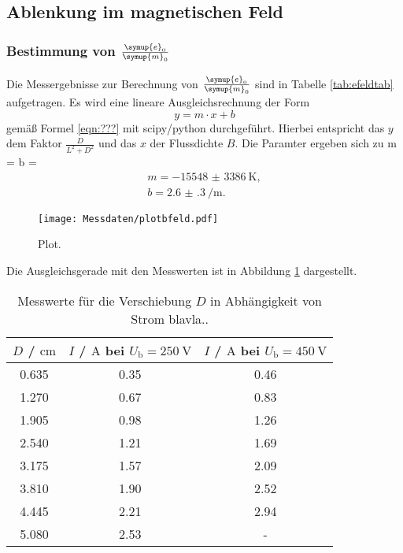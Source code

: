 \FloatBarrier
\subsection{Ablenkung im magnetischen Feld}

\subsubsection{Bestimmung von $\frac{\symup{e}_0}{\symup{m}_0}$}
Die Messergebnisse zur Berechnung von $\frac{\symup{e}_0}{\symup{m}_0}$ sind in Tabelle
\ref{tab:efeldtab} aufgetragen. Es wird eine lineare Ausgleichsrechnung der Form 
\begin{equation*}
	y = m \cdot x + b
\end{equation*}
gemäß Formel \eqref{eqn:???} mit scipy/python \cite{scipy} durchgeführt. Hierbei entspricht das
$y$ dem Faktor $\frac{D}{L^2+D^2}$ und das $x$ der Flussdichte $B$.
Die Paramter ergeben sich zu
m = b =  \begin{gather*}
	m = -\SI{15548(3386)}{\kelvin} \mathrm{,} \\
	b = \SI{2.6(3)}{\per\meter} \mathrm{.}
\end{gather*}
\begin{figure}
  \centering
  \texttt{[image: Messdaten/plotbfeld.pdf]}
  \caption{Plot.}
  \label{fig:bfeldplot}
\end{figure}
Die Ausgleichsgerade mit den Messwerten ist in Abbildung \ref{fig:bfeldplot} dargestellt.

\begin{table}
	\caption{Messwerte für die Verschiebung $D$ in Abhängigkeit von Strom blavla..}
	\label{tab:bfeldtab}
	\centering
	\begin{tabular}{ccc}
	\toprule
		$D$ / $\si{\centi\meter}$ & $I$ / $\si{\ampere}$ bei $U_{\mathrm{b}}=\SI{250}{\volt}$ & $I$ / $\si{\ampere}$ bei $U_{\mathrm{b}}=\SI{450}{\volt}$ \\
	\midrule
		0.635 & 0.35 & 0.46 \\
		1.270 & 0.67 & 0.83 \\
		1.905 & 0.98 & 1.26 \\
		2.540 & 1.21 & 1.69 \\
		3.175 & 1.57 & 2.09 \\
		3.810 & 1.90 & 2.52 \\
		4.445 & 2.21 & 2.94 \\
		5.080 & 2.53 & - \\
	\bottomrule
	\end{tabular}
\end{table}
